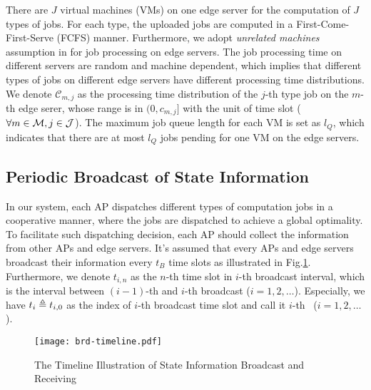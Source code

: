 There are $J$ virtual machines (VMs) on one edge server for the computation of $J$ types of jobs.
For each type, the uploaded jobs are computed in a First-Come-First-Serve (FCFS) manner.
Furthermore, we adopt \emph{unrelated machines} assumption in \cite{tan-online} for job processing on edge servers.
The job processing time on different servers are random and machine dependent, which implies that different types of jobs on different edge servers have different processing time distributions.
We denote $\mathcal{C}_{m,j}$ as the processing time distribution of the $j$-th type job on the $m$-th edge serer, whose range is in $(0, c_{m,j}]$ with the unit of time slot ($\forall m\in\mathcal{M}, j\in\mathcal{J}$).
The maximum job queue length for each VM is set as $l_Q$, which indicates that there are at most $l_Q$ jobs pending for one VM on the edge servers.


\subsection{Periodic Broadcast of State Information}
In our system, each AP dispatches different types of computation jobs in a cooperative manner, where the jobs are dispatched to achieve a global optimality.
To facilitate such dispatching decision, each AP should collect the information from other APs and edge servers.
It's assumed that every APs and edge servers broadcast their information every $t_B$ time slots as illustrated in Fig.\ref{fig:brd-timeline}.
Furthermore, we denote $t_{i,n}$ as the $n$-th time slot in $i$-th broadcast interval, which is the interval between $(i-1)$-th and $i$-th broadcast ($i=1,2,\dots$).
Especially, we have $t_{i} \triangleq t_{i,0}$ as the index of $i$-th broadcast time slot and call it $i$-th \brpoint~($i=1,2,\dots$).
\begin{figure}[ht]
    \centering
    \texttt{[image: brd-timeline.pdf]}
    \caption{The Timeline Illustration of State Information Broadcast and Receiving}
    \label{fig:brd-timeline}
\end{figure}

